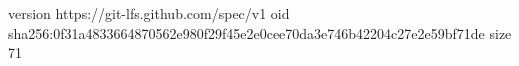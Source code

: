 version https://git-lfs.github.com/spec/v1
oid sha256:0f31a4833664870562e980f29f45e2e0cee70da3e746b42204c27e2e59bf71de
size 71
